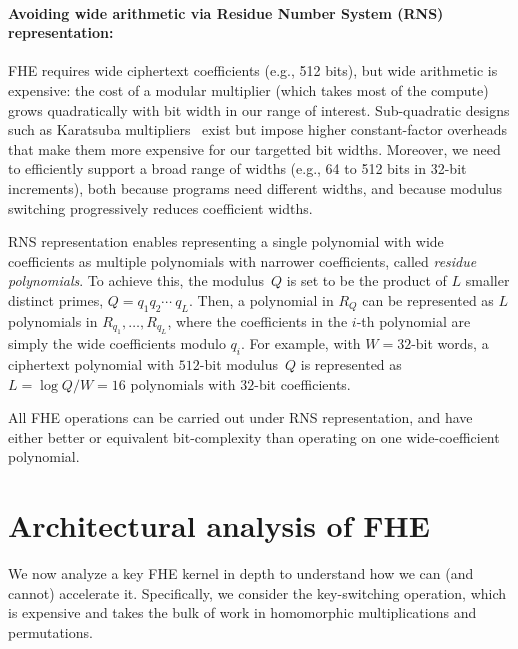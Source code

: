 \paragraph{Avoiding wide arithmetic via Residue Number System (RNS) representation:}
FHE requires wide ciphertext coefficients (e.g., 512 bits), but wide arithmetic is expensive:
the cost of a modular multiplier (which takes most of the compute)
grows quadratically with bit width in our range of interest. Sub-quadratic designs such as Karatsuba multipliers~\cite{karatsuba:1962:multiplication} exist but impose higher constant-factor overheads that make them more expensive for our targetted bit widths.
Moreover, we need to efficiently support a broad range of widths (e.g., 64 to 512 bits in 32-bit increments),
both because programs need different widths, and because modulus switching progressively reduces coefficient widths.

RNS representation \cite{garner1959residue}  %
enables representing a single polynomial with wide coefficients as multiple polynomials with narrower coefficients,
called \emph{residue polynomials}.
To achieve this, the modulus~$Q$  is set to be the product of $L$
smaller distinct primes, $Q = q_1q_2\cdots\ q_L$.
Then, a polynomial in $R_Q$ can be represented as $L$ polynomials in
$R_{q_1}, \ldots, R_{q_L}$,
where the coefficients in the $i$-th polynomial are simply the wide coefficients modulo $q_i$.
%
For example, with $W = 32$-bit words, a ciphertext polynomial with $512$-bit modulus~$Q$ is represented as
$L = \log Q/W = 16$ polynomials with $32$-bit coefficients.

All FHE operations can be carried out under RNS representation, and have either better or equivalent bit-complexity than
  operating on one wide-coefficient polynomial.

\section{Architectural analysis of FHE}
\label{sec:fhe_analysis}

We now analyze a key FHE kernel in depth to understand how we can (and cannot) accelerate it.
Specifically, we consider the key-switching operation,
which is expensive and takes the bulk of work in homomorphic multiplications and permutations.

